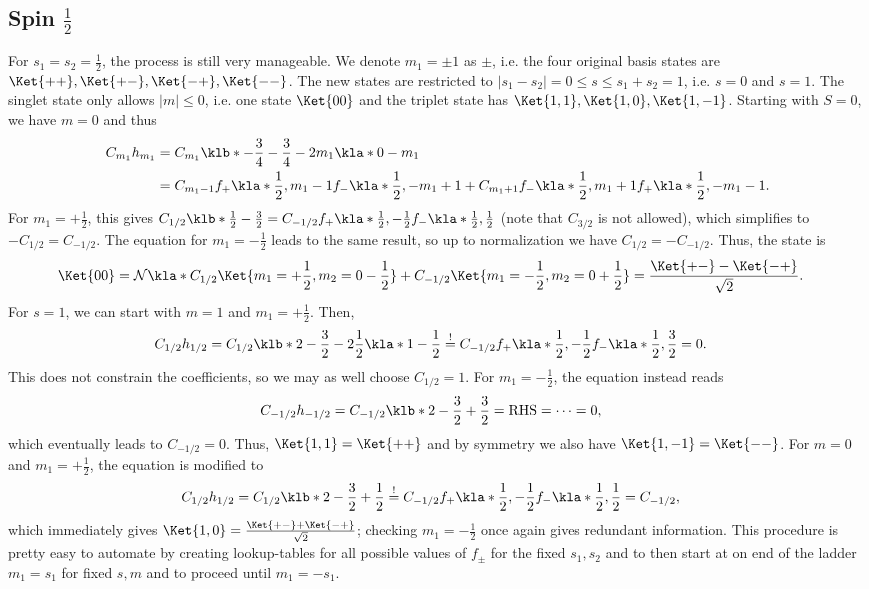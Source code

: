 \documentclass[english, parskip=full]{scrartcl}
\begin{document}
\subsection{Spin $\frac{1}{2}$}
For $s_1=s_2=\frac{1}{2}$, the process is still very manageable.
We denote $m_1=\pm 1$ as $\pm$, i.e. the four original basis states are $\Ket{++}, \Ket{+-}, \Ket{-+},\Ket{--}$.
The new states are restricted to $|s_1-s_2|=0\le s \le s_1+s_2=1$, i.e. $s=0$ and $s=1$.
The singlet state only allows $|m|\le 0$, i.e. one state $\Ket{00}$ and the triplet state has $\Ket{1,1}, \Ket{1,0}, \Ket{1,-1}$.
Starting with $S=0$, we have $m=0$ and thus
\begin{align}
C_{m_1} h_{m_1} &= C_{m_1} \klb*{-\frac{3}{4} - \frac{3}{4} - 2m_1\kla*{0 - m_1}}\\
&= C_{m_1-1} f_+\kla*{\frac{1}{2}, m_1-1} f_-\kla*{\frac{1}{2}, -m_1+1} + C_{m_1+1} f_-\kla*{\frac{1}{2}, m_1+1} f_+\kla*{\frac{1}{2}, -m_1-1}.
\end{align}
For $m_1=+\frac{1}{2}$, this gives $C_{1/2} \klb*{\frac{1}{2} - \frac{3}{2}} = C_{-1/2} f_+\kla*{\frac{1}{2},-\frac{1}{2}} f_-\kla*{\frac{1}{2},\frac{1}{2}}$ (note that $C_{3/2}$ is not allowed), which simplifies to $-C_{1/2} = C_{-1/2}$.
The equation for $m_1=-\frac{1}{2}$ leads to the same result, so up to normalization we have $C_{1/2} = -C_{-1/2}$.
Thus, the state is
\begin{align}
\Ket{00} &= \mathcal{N} \kla*{C_{1/2} \Ket{m_1=+\frac{1}{2}, m_2=0 - \frac{1}{2}} + C_{-1/2} \Ket{m_1=-\frac{1}{2}, m_2=0 + \frac{1}{2}}} =  \frac{\Ket{+-} - \Ket{-+}}{\sqrt{2}}.
\end{align}
For $s=1$, we can start with $m=1$ and $m_1=+\frac{1}{2}$.
Then,
\begin{align}
C_{1/2} h_{1/2} &= C_{1/2} \klb*{2 - \frac{3}{2} - 2 \frac{1}{2} \kla*{1-\frac{1}{2}}} \overset{!}{=} C_{-1/2} f_+\kla*{\frac{1}{2},-\frac{1}{2}} f_-\kla*{\frac{1}{2},\frac{3}{2}} = 0.
\end{align}
This does not constrain the coefficients, so we may as well choose $C_{1/2}=1$.
For $m_1=-\frac{1}{2}$, the equation instead reads
\begin{align}
C_{-1/2} h_{-1/2} &= C_{-1/2} \klb*{2 - \frac{3}{2} + \frac{3}{2}} = \text{RHS} = \dots = 0,
\end{align}
which eventually leads to $C_{-1/2} = 0$.
Thus, $\Ket{1,1} = \Ket{++}$ and by symmetry we also have $\Ket{1,-1} = \Ket{--}$.
For $m=0$ and $m_1=+\frac{1}{2}$, the equation is modified to
\begin{align}
C_{1/2} h_{1/2} &= C_{1/2} \klb*{2 - \frac{3}{2} + \frac{1}{2}} \overset{!}{=} C_{-1/2} f_+\kla*{\frac{1}{2},-\frac{1}{2}} f_-\kla*{\frac{1}{2},\frac{1}{2}} = C_{-1/2},
\end{align}
which immediately gives $\Ket{1,0} = \frac{\Ket{+-} + \Ket{-+}}{\sqrt{2}}$; checking $m_1=-\frac{1}{2}$ once again gives redundant information.
This procedure is pretty easy to automate by creating lookup-tables for all possible values of $f_\pm$ for the fixed $s_1,s_2$ and to then start at on end of the ladder $m_1=s_1$ for fixed $s,m$ and to proceed until $m_1=-s_1$.
\end{document}
